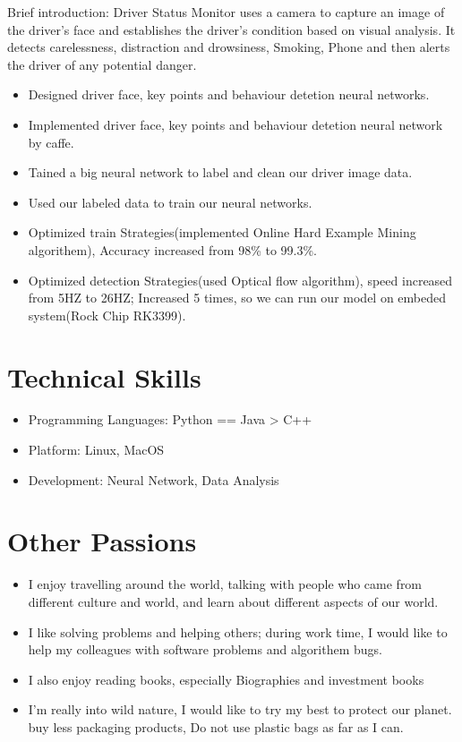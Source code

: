 \documentclass{resume}
\begin{document}
Brief introduction: Driver Status Monitor uses a camera to capture an image of the driver’s face and establishes the driver’s condition based on visual analysis. It detects carelessness, distraction and drowsiness, Smoking, Phone and then alerts the driver of any potential danger.
\begin{itemize}
  \item Designed driver face, key points and behaviour detetion neural networks.
  \item Implemented driver face, key points and behaviour detetion neural network by caffe.
  \item Tained a big neural network to label and clean our driver image data.
  \item Used our labeled data to train our neural networks.
  \item Optimized train Strategies(implemented Online Hard Example Mining algorithem), Accuracy increased from 98\% to 99.3\%.
  \item Optimized detection Strategies(used Optical flow algorithm), speed increased from 5HZ to 26HZ; Increased 5 times, so we can run our model on embeded system(Rock Chip RK3399).

\end{itemize}

\section{Technical Skills}
\begin{itemize}[parsep=0.5ex]
  \item Programming Languages: Python == Java > C++
  \item Platform: Linux, MacOS
  \item Development: Neural Network, Data Analysis
\end{itemize}

\section{Other Passions}
\begin{itemize}[parsep=0.5ex]
  \item I enjoy travelling around the world, talking with people who came from different culture and world, and learn about different aspects of our world.
  \item I like solving problems and helping others; during work time, I would like to help my colleagues with software problems and algorithem bugs.
  \item I also enjoy reading books, especially Biographies and investment books
  \item I'm really into wild nature, I would like to try my best to protect our planet. buy less packaging products, Do not use plastic bags as far as I can.
\end{itemize}
\end{document}
